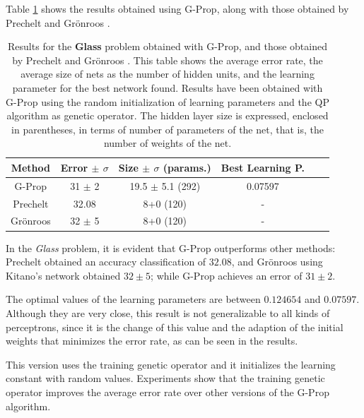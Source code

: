 \documentclass{llncs}
\begin{document}
Table \ref{table:glass} shows the results obtained using G-Prop, along with those obtained by Prechelt \cite{Prechelt94c} and Gr\"{o}nroos \cite{MAG98}.

\begin{table}[!h]
\begin{center}
\begin{tabular}{|c||c|c|c|c|c|}
\hline 
Method         & Error $\pm$ $\sigma$ & Size $\pm$ $\sigma$ (params.) &  Best Learning P. \\
\hline
\hline
G-Prop         &  31  $\pm$ 2       &  19.5 $\pm$ 5.1  (292) & 0.07597  \\
\hline
Prechelt       &  32.08             &   8+0    (120)         & -  \\
\hline
Gr\"{o}nroos   &    32 $\pm$ 5      &   8+0    (120)         & -  \\ 
\hline
\end{tabular}
\end{center}
\caption{\small{Results for the \textbf{Glass} problem obtained with G-Prop, and those obtained by Prechelt \cite{Prechelt94c} and Gr\"{o}nroos \cite{MAG98}. This table shows the average error rate, the average size of nets as the number of hidden units, and the learning parameter for the best network found. Results have been obtained with G-Prop using the random initialization of learning parameters and the QP algorithm as genetic operator. The hidden layer size is expressed, enclosed in parentheses, in terms of number of parameters of the net, that is, the number of weights of the net.}}
\label{table:glass}
\end{table}


In the \emph{Glass} problem, it is evident that G-Prop outperforms other methods: Prechelt \cite{Prechelt94c} obtained an accuracy classification of $32.08$, and Gr\"{o}nroos \cite{MAG98} using Kitano's network obtained $32 \pm 5$; while G-Prop achieves an error of $31 \pm 2$.

The optimal values of the learning parameters are between $0.124654$ and $0.07597$. Although they are very close, this result is not generalizable to all kinds of perceptrons, since it is the change of this value and the adaption of the initial weights that minimizes the error rate, as can be seen in the results.

\bigskip

This version uses the training genetic operator and it initializes the learning constant with random values. Experiments show that the training genetic operator improves the average error rate over other versions of the G-Prop algorithm.
\end{document}

